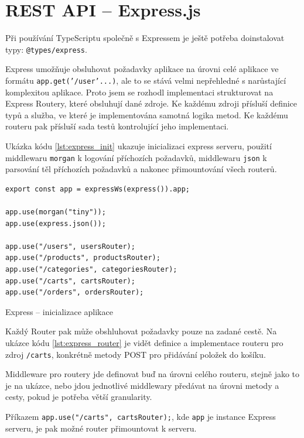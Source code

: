 \documentclass[thesis=M,czech]{FITthesis}[2019/12/23]
\begin{document}
\section{REST API -- Express.js}
Při používání TypeScriptu společně s Expressem je ještě potřeba doinstalovat typy: \texttt{@types/express}.

Express umožňuje obsluhovat požadavky aplikace na úrovni celé aplikace ve formátu \texttt{app.get('/user'...)}, ale to se stává velmi nepřehledné s narůstající komplexitou aplikace. Proto jsem se rozhodl implementaci strukturovat na Express Routery, které obsluhují dané zdroje. Ke každému zdroji přísluší definice typů a služba, ve které je implementována samotná logika metod. Ke každému routeru pak přísluší sada testů kontrolující jeho implementaci.

Ukázka kódu \ref{lst:express_init} ukazuje inicializaci express serveru, použití middlewaru \texttt{morgan} k logování příchozích požadavků, middlewaru \texttt{json} k parsování těl příchozích požadavků a nakonec přimountování všech routerů.

\begin{listing}[H]
\begin{verbatim}
export const app = expressWs(express()).app;

app.use(morgan("tiny"));
app.use(express.json());

app.use("/users", usersRouter);
app.use("/products", productsRouter);
app.use("/categories", categoriesRouter);
app.use("/carts", cartsRouter);
app.use("/orders", ordersRouter);

\end{verbatim}
\caption{Express -- inicializace aplikace}
\label{lst:express_init}
\end{listing}

Každý Router pak může obshluhovat požadavky pouze na zadané cestě. Na ukázce kódu \ref{lst:express_router} je vidět definice a implementace routeru pro zdroj \texttt{/carts}, konkrétně metody POST pro přidávání položek do košíku.

Middleware pro routery jde definovat buď na úrovni celého routeru, stejně jako to je na ukázce, nebo jdou jednotlivé middlewary předávat na úrovni metody a cesty, pokud je potřeba větší granularity.

Příkazem \texttt{app.use("/carts", cartsRouter);}, kde \texttt{app} je instance Express serveru, je pak možné router přimountovat k serveru.
\end{document}
